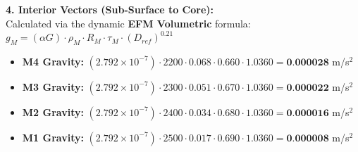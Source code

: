 \documentclass[11pt, a4paper]{article}
\begin{document}
  \vspace{0.5em}
  \noindent \textbf{4. Interior Vectors (Sub-Surface to Core):} \\[0.5em]
  \hspace*{1em} Calculated via the dynamic \textbf{EFM Volumetric} formula: $g_M = (\alpha G) \cdot \rho_{M} \cdot R_M \cdot \tau_M \cdot (D_{ref})^{0.21}$
  \begin{itemize}
    \item \textbf{M4 Gravity:} $(2.792 \times 10^{-7}) \cdot 2200 \cdot 0.068 \cdot 0.660 \cdot 1.0360 = \textbf{0.000028}$ m/s$^2$
    \item \textbf{M3 Gravity:} $(2.792 \times 10^{-7}) \cdot 2300 \cdot 0.051 \cdot 0.670 \cdot 1.0360 = \textbf{0.000022}$ m/s$^2$
    \item \textbf{M2 Gravity:} $(2.792 \times 10^{-7}) \cdot 2400 \cdot 0.034 \cdot 0.680 \cdot 1.0360 = \textbf{0.000016}$ m/s$^2$
    \item \textbf{M1 Gravity:} $(2.792 \times 10^{-7}) \cdot 2500 \cdot 0.017 \cdot 0.690 \cdot 1.0360 = \textbf{0.000008}$ m/s$^2$
  \end{itemize}
\end{document}
